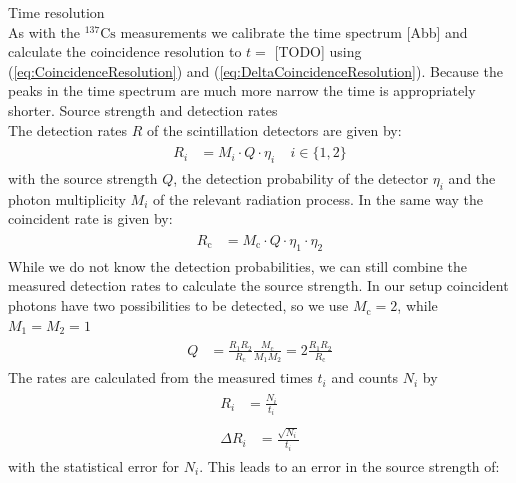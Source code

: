 %
Time resolution \\
%
As with the $^{137}\text{Cs}$ measurements we calibrate the time spectrum [Abb] and calculate the coincidence resolution to $t = $ [TODO] using (\ref{eq:CoincidenceResolution}) and (\ref{eq:DeltaCoincidenceResolution}).
Because the peaks in the time spectrum are much more narrow the time is appropriately shorter.
%
Source strength and detection rates\\
%
The detection rates $R$ of the scintillation detectors are given by:
%
\begin{align}
    \label{eq:DetectionRates}
    \begin{split}
        R_i &= M_i \cdot Q \cdot \eta_i ~~~~~ i \in \{1,2\}
    \end{split}
\end{align}
%
with the source strength $Q$, the detection probability of the detector $\eta_i$ and the photon multiplicity $M_i$ of the relevant radiation process.
In the same way the coincident rate is given by:
%
\begin{align}
    \label{eq:CoincidenceDetectionRates}
    \begin{split}
        R_{\text{c}} &= M_{\text{c}} \cdot Q \cdot \eta_1 \cdot \eta_2
    \end{split}
\end{align}
%
While we do not know the detection probabilities, we can still combine the measured detection rates to calculate the source strength. In our setup coincident photons have two possibilities to be detected, so we use $M_{\text{c}} = 2$, while $M_1 = M_2 = 1$
%
\begin{align}
    \label{eq:SourceStrength}
    \begin{split}
        Q &= \frac{R_1 R_2}{R_{\text{c}}} \frac{ M_{\text{c}}}{M_1 M_2} = 2 \frac{R_1 R_2}{R_{\text{c}}}
    \end{split}
\end{align}
%
The rates are calculated from the measured times $t_i$ and counts $N_i$ by
%
\begin{align}
    \label{eq:RateMeasured}
    \begin{split}
        R_i  &= \frac{N_i}{t_i}
    \end{split}
    \\
    \label{eq:DeltaRateMeasured}
    \begin{split}
        \Delta R_i &= \frac{\sqrt{N_i}}{t_i}
    \end{split}
\end{align}
%
with the statistical error for $N_i$. This leads to an error in the source strength of:
